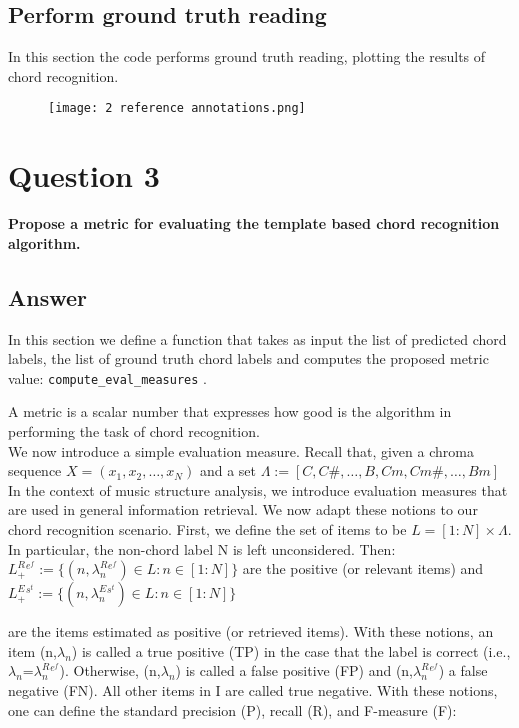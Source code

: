 \documentclass{article}
\begin{document}
\subsection*{Perform ground truth reading}
In this section the code performs ground truth reading, plotting the results of chord recognition.

\begin{figure}[H]
 \centering
 \texttt{[image: 2 reference annotations.png]}
\end{figure}


\section*{\color{red}Question 3}

\begin{problem}
	\textbf{Propose a metric for evaluating the template based chord recognition algorithm.}
\end{problem}

\subsection*{\color{blue}Answer}

In this section we define a function that takes as input the list of predicted chord labels, the list of ground truth chord labels and computes the proposed metric value: \verb |compute_eval_measures| .

A metric is a scalar number that expresses how good is the algorithm in performing the task of chord recognition.\\

We now introduce a simple evaluation measure. Recall that, given a chroma sequence \(X=(x_1,x_2,…,x_N)\) and a set \( \Lambda :=[C,C\#,…,B,Cm,Cm\#,…,Bm] \)\\

In the context of music structure analysis, we introduce evaluation measures that are used in general information retrieval. We now adapt these notions to our chord recognition scenario. First, we define the set of items to be $L=[1:N] \times \Lambda$. In particular, the non-chord label N is left unconsidered. Then:
$L_+^R^e^f := \{(n,\lambda_n^R^e^f) \in L:n\in[1:N]\}$ are the positive (or relevant items) and $L_+^E^s^t :=\{(n,\lambda_n^E^s^t) \in L:n\in[1:N]\}$

are the items estimated as positive (or retrieved items). With these notions, an item (n,$\lambda_n$) is called a true positive (TP) in the case that the label is correct (i.e., $\lambda_n$=$\lambda_n^R^e^f$). Otherwise, (n,$\lambda_n$) is called a false positive (FP) and (n,$\lambda_n^R^e^f$) a false negative (FN). All other items in I are called true negative. With these notions, one can define the standard precision (P), recall (R), and F-measure (F):
\end{document}
